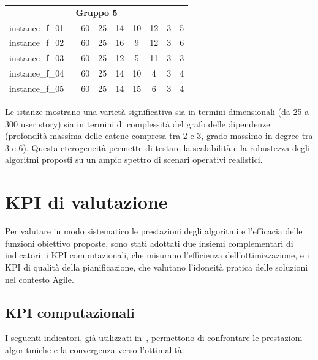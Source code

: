 \documentclass[12pt,a4paper,openright,twoside]{book}
\begin{document}
\begin{table}[H]
\begin{tabular}{llccccccc}
\multicolumn{9}{c}{\textbf{Gruppo 5}} \\
instance\_f\_01 &  &  60 & 25 & 14 & 10 & 12 & 3 & 5 \\
instance\_f\_02 &  &  60 & 25 & 16 & 9 & 12 & 3 & 6 \\
instance\_f\_03 &  &  60 & 25 & 12 & 5 & 11 & 3 & 3 \\
instance\_f\_04 &  &  60 & 25 & 14 & 10 & 4 & 3 & 4 \\
instance\_f\_05 &  &  60 & 25 & 14 & 15 & 6 & 3 & 4 \\
\midrule
\end{tabular}
\end{table}

Le istanze mostrano una varietà significativa sia in termini dimensionali (da 25 a 300 user story) sia in termini di complessità del grafo delle dipendenze (profondità massima delle catene compresa tra 2 e 3, grado massimo in-degree tra 3 e 6). Questa eterogeneità permette di testare la scalabilità e la robustezza degli algoritmi proposti su un ampio spettro di scenari operativi realistici.

\section{KPI di valutazione}

Per valutare in modo sistematico le prestazioni degli algoritmi e l'efficacia delle funzioni obiettivo proposte, sono stati adottati due insiemi complementari di indicatori: i KPI computazionali, che misurano l'efficienza dell'ottimizzazione, e i KPI di qualità della pianificazione, che valutano l'idoneità pratica delle soluzioni nel contesto Agile.

\subsection{KPI computazionali}

I seguenti indicatori, già utilizzati in~\cite{BOSCHETTI2014116}, permettono di confrontare le prestazioni algoritmiche e la convergenza verso l'ottimalità:
\end{document}
